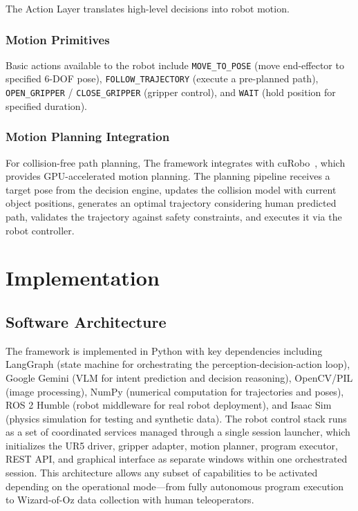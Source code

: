\documentclass[sensors,article,submit,pdftex,moreauthors]{Definitions/mdpi}
\begin{document}
The Action Layer translates high-level decisions into robot motion.

\subsubsection{Motion Primitives}

Basic actions available to the robot include \texttt{MOVE\_TO\_POSE} (move end-effector to specified 6-DOF pose), \texttt{FOLLOW\_TRAJECTORY} (execute a pre-planned path), \texttt{OPEN\_GRIPPER} / \texttt{CLOSE\_GRIPPER} (gripper control), and \texttt{WAIT} (hold position for specified duration).

\subsubsection{Motion Planning Integration}

For collision-free path planning, The framework integrates with cuRobo~\cite{Liu2023}, which provides GPU-accelerated motion planning. The planning pipeline receives a target pose from the decision engine, updates the collision model with current object positions, generates an optimal trajectory considering human predicted path, validates the trajectory against safety constraints, and executes it via the robot controller.

\section{Implementation}

\subsection{Software Architecture}

The framework is implemented in Python with key dependencies including LangGraph (state machine for orchestrating the perception-decision-action loop), Google Gemini (VLM for intent prediction and decision reasoning), OpenCV/PIL (image processing), NumPy (numerical computation for trajectories and poses), ROS 2 Humble (robot middleware for real robot deployment), and Isaac Sim (physics simulation for testing and synthetic data). The robot control stack runs as a set of coordinated services managed through a single session launcher, which initializes the UR5 driver, gripper adapter, motion planner, program executor, REST API, and graphical interface as separate windows within one orchestrated session. This architecture allows any subset of capabilities to be activated depending on the operational mode---from fully autonomous program execution to Wizard-of-Oz data collection with human teleoperators.
\end{document}
